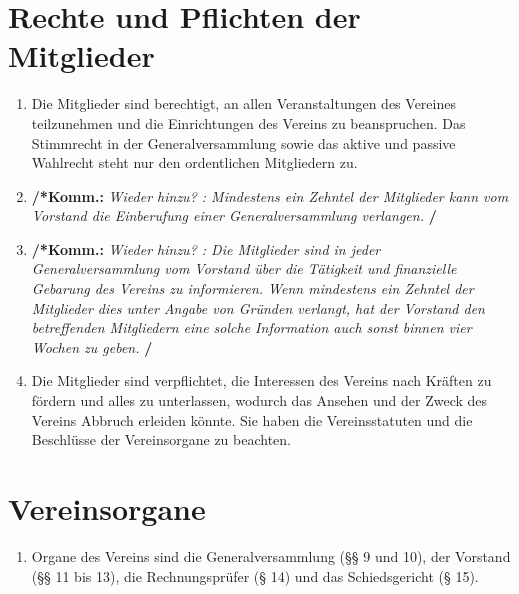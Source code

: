 \documentclass[a4paper,12pt]{article}
\newcommand{\comment}[1]{{\bf /*Komm.:} \textit{#1} {\bf */}}
\begin{document}
\section{Rechte und Pflichten der Mitglieder} %
\begin{enumerate}

\item Die Mitglieder sind berechtigt, an allen Veranstaltungen des Vereines teilzunehmen und die Einrichtungen des Vereins zu beanspruchen.
Das Stimmrecht in der Generalversammlung sowie das aktive und passive Wahlrecht steht nur den ordentlichen Mitgliedern zu.

\item \comment{Wieder hinzu? : Mindestens ein Zehntel der Mitglieder kann vom Vorstand die Einberufung einer Generalversammlung verlangen.}
\item \comment{Wieder hinzu? : Die Mitglieder sind in jeder Generalversammlung vom Vorstand über die Tätigkeit und finanzielle Gebarung des Vereins zu informieren. Wenn mindestens ein Zehntel der Mitglieder dies unter Angabe von Gründen verlangt, hat der Vorstand den betreffenden Mitgliedern eine solche Information auch sonst binnen vier Wochen zu geben.}

\item Die Mitglieder sind verpflichtet, die Interessen des Vereins nach Kräften zu fördern und alles zu unterlassen, wodurch das Ansehen und der Zweck des Vereins Abbruch erleiden könnte. Sie haben die Vereinsstatuten und die Beschlüsse der Vereinsorgane zu beachten.
\end{enumerate}

\section{Vereinsorgane} %
\begin{enumerate}
\item Organe des Vereins sind die Generalversammlung (§§ 9 und 10), der Vorstand (§§ 11 bis 13), die Rechnungsprüfer (§ 14) und das Schiedsgericht (§ 15).
\end{enumerate}
\end{document}
